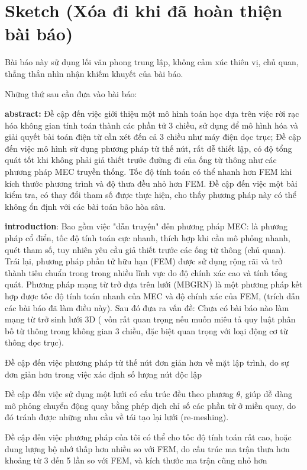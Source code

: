 \section{Sketch (Xóa đi khi đã hoàn thiện bài báo)}
Bài báo này sử dụng lối văn phong trung lập, không cảm xúc thiên vị, chủ quan, thẳng thắn nhìn nhận khiếm khuyết của bài báo.

Những thứ sau cần đưa vào bài báo:

\textbf{abstract:} Đề cập đến việc giới thiệu một mô hình toán học dựa trên việc rời rạc hóa không gian tính toán thành các phần tử 3 chiều, sử dụng để mô hình hóa và giải quyết bài toán điện từ cần xét đến cả 3 chiều như máy điện dọc trục; Đề cập đến việc mô hình sử dụng phương pháp từ thế nút, rất dễ thiết lập, có độ tổng quát tốt khi không phải giả thiết trước đường đi của ống từ thông như các phương pháp MEC truyền thống. Tốc độ tính toán có thể nhanh hơn FEM khi kích thước phương trình và độ thưa đều nhỏ hơn FEM. Đề cập đến việc một bài kiểm tra, có thay đổi tham số được thực hiện, cho thấy phương pháp này có thể không ổn định với các bài toán bão hòa sâu.

\textbf{introduction}: 
Bao gồm việc "dẫn truyện" đến phương pháp MEC: là phương pháp cổ điển, tốc độ tính toán cực nhanh, thích hợp khi cần mô phỏng nhanh, quét tham số, tuy nhiên yêu cầu giả thiết trước các ống từ thông (chủ quan). Trái lại, phương pháp phần tử hữu hạn (FEM) được sử dụng rộng rãi và trở thành tiêu chuẩn trong trong nhiều lĩnh vực do độ chính xác cao và tính tổng quát. Phương pháp mạng từ trở dựa trên lưới (MBGRN) là một phương pháp kết hợp được tốc độ tính toán nhanh của MEC và độ chính xác của FEM, (trích dẫn các bài báo đã làm điều này). Sau đó đưa ra vấn đề: Chưa có bài báo nào làm mạng từ trở sinh lưới 3D ( vốn rất quan trọng nếu muốn miêu tả quy luật phân bố từ thông trong không gian 3 chiều, đặc biệt quan trọng với loại động cơ từ thông dọc trục).

Đề cập đến việc phương pháp từ thế nút đơn giản hơn về mặt lập trình, do sự đơn giản hơn trong việc xác định số lượng nút độc lập

Đề cập đến việc sử dụng một lưới có cấu trúc đều theo phương $\theta$, giúp dễ dàng mô phỏng chuyển động quay bằng phép dịch chỉ số các phần tử ở miền quay, do đó tránh được những nhu cầu về tái tạo lại lưới (re-meshing).

Đề cập đến việc phương pháp của tôi có thể cho tốc độ tính toán rất cao, hoặc dung lượng bộ nhớ thấp hơn nhiều so với FEM, do cấu trúc ma trận thưa hơn khoảng từ 3 đến 5 lần so với FEM, và kích thước ma trận cũng nhỏ hơn 

\clearpage